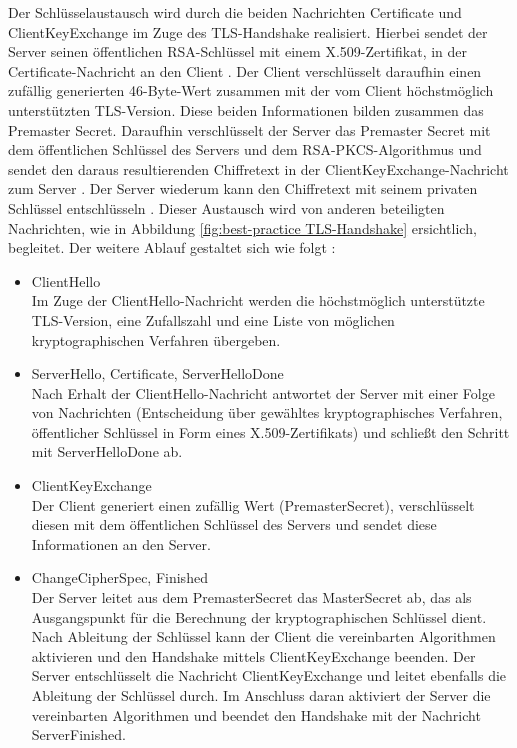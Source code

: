 \bigbreak
Der Schlüsselaustausch wird durch die beiden Nachrichten \glqq{}Certificate\grqq{} und \glqq{}ClientKeyExchange\grqq{} im Zuge des TLS-Handshake realisiert. Hierbei sendet der Server seinen öffentlichen RSA-Schlüssel mit einem X.509-Zertifikat, in der \glqq{}Certificate\grqq{}-Nachricht an den Client \autocite{X509}. Der Client verschlüsselt daraufhin einen zufällig generierten 46-Byte-Wert zusammen mit der vom Client höchstmöglich unterstützten TLS-Version. Diese beiden Informationen bilden zusammen das \glqq{}Premaster Secret\grqq{}. Daraufhin verschlüsselt der Server das Premaster Secret mit dem öffentlichen Schlüssel des Servers und dem RSA-PKCS-Algorithmus und sendet den daraus resultierenden Chiffretext in der \glqq{}ClientKeyExchange\grqq{}-Nachricht zum Server \autocite{RSAPKCS}. Der Server wiederum kann den Chiffretext mit seinem privaten Schlüssel entschlüsseln \autocite{RFC3447}. Dieser Austausch wird von anderen beteiligten Nachrichten, wie in Abbildung \ref{fig:best-practice TLS-Handshake} ersichtlich, begleitet. \autocite{SchwenkJörg2020SuKi} 
\bigbreak
Der weitere Ablauf gestaltet sich wie folgt \autocite{SchwenkJörg2020SuKi}:
\begin{itemize}
    \item ClientHello\\
    Im Zuge der ClientHello-Nachricht werden die höchstmöglich unterstützte TLS-Version, eine Zufallszahl und eine Liste von möglichen kryptographischen Verfahren übergeben.
    \item ServerHello, Certificate, ServerHelloDone\\
    Nach Erhalt der ClientHello-Nachricht antwortet der Server mit einer Folge von Nachrichten (Entscheidung über gewähltes kryptographisches Verfahren, öffentlicher Schlüssel in Form eines X.509-Zertifikats) und schließt den Schritt mit ServerHelloDone ab. 
    \item ClientKeyExchange\\
    Der Client generiert einen zufällig Wert (PremasterSecret), verschlüsselt diesen mit dem öffentlichen Schlüssel des Servers und sendet diese Informationen an den Server.
    \item ChangeCipherSpec, Finished\\
    Der Server leitet aus dem PremasterSecret das MasterSecret ab, das als Ausgangspunkt für die Berechnung der kryptographischen Schlüssel dient. Nach Ableitung der Schlüssel kann der Client die vereinbarten Algorithmen aktivieren und den Handshake mittels ClientKeyExchange beenden. Der Server entschlüsselt die Nachricht ClientKeyExchange und leitet ebenfalls die Ableitung der Schlüssel durch. Im Anschluss daran aktiviert der Server die vereinbarten Algorithmen und beendet den Handshake mit der Nachricht ServerFinished.
\end{itemize}
